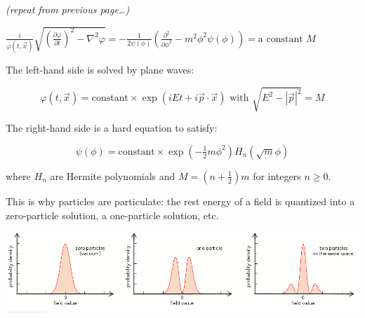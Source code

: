 \documentclass[compress]{beamer}
\begin{document}
\begin{frame}
{\scriptsize \it (repeat from previous page\ldots)}

\mbox{$\displaystyle \frac{i}{\varphi(t, \vec{x})} \sqrt{\left( \frac{\partial \varphi}{\partial t} \right)^2 - \nabla^2 \varphi} = -\frac{1}{2\psi(\phi)} \left( \frac{\partial^2}{\partial \phi^2} - m^2 \phi^2 \psi(\phi) \right) = \mbox{a constant } M$\hspace{-1 cm}}

\vfill
The left-hand side is solved by plane waves:

\vspace{-0.3 cm}
\[ \varphi(t, \vec{x}) = \mbox{constant} \times \exp(iEt + i\vec{p} \cdot \vec{x}) \mbox{ with } \sqrt{E^2 - |\vec{p}|^2} = M \]

\vfill
The right-hand side is a hard equation to satisfy:

\vspace{-0.3 cm}
\[ \psi(\phi) = \mbox{constant} \times \exp(-\tfrac{1}{2} m \phi^2) H_n(\sqrt{m} \phi) \]

where $H_n$ are Hermite polynomials and $M = (n + \tfrac{1}{2}) m$ for integers $n \ge 0$.

\vspace{0.3 cm}
This is why particles are particulate: the rest energy of a field is quantized into a zero-particle solution, a one-particle solution, etc.

\vfill
\includegraphics[width=\linewidth]{fieldvalues.png}
\end{frame}
\end{document}
